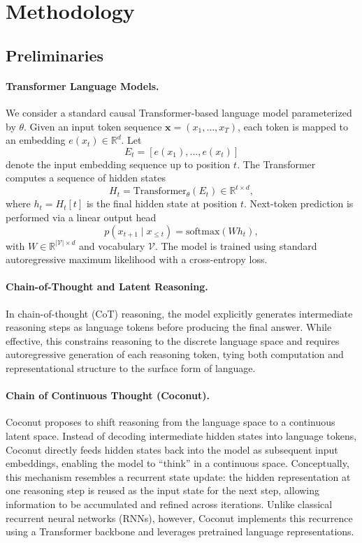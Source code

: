 \section{Methodology}
\subsection{Preliminaries}
\label{sec:preliminaries}

\paragraph{Transformer Language Models.}
We consider a standard causal Transformer-based language model parameterized by $\theta$. Given an input token sequence
$\mathbf{x} = (x_1, \dots, x_T)$, each token is mapped to an embedding $e(x_t) \in \mathbb{R}^d$. Let
\[
E_t = [e(x_1), \dots, e(x_t)]
\]
denote the input embedding sequence up to position $t$. The Transformer computes a sequence of hidden states
\[
H_t = \mathrm{Transformer}_\theta(E_t) \in \mathbb{R}^{t \times d},
\]
where $h_t = H_t[t]$ is the final hidden state at position $t$. Next-token prediction is performed via a linear output head
\[
p(x_{t+1} \mid x_{\le t}) = \mathrm{softmax}(W h_t),
\]
with $W \in \mathbb{R}^{|\mathcal{V}| \times d}$ and vocabulary $\mathcal{V}$. The model is trained using standard
autoregressive maximum likelihood with a cross-entropy loss.

\paragraph{Chain-of-Thought and Latent Reasoning.}
In chain-of-thought (CoT) reasoning, the model explicitly generates intermediate reasoning steps as language tokens before producing the final answer. While effective, this constrains reasoning to the discrete language space and requires autoregressive generation of each reasoning token, tying both computation and representational structure to the surface form of language.

\paragraph{Chain of Continuous Thought (Coconut).}
Coconut proposes to shift reasoning from the language space to a continuous latent space. Instead of decoding intermediate hidden states into language tokens, Coconut directly feeds hidden states back into the model as subsequent input embeddings, enabling the model to ``think'' in a continuous space. Conceptually, this mechanism resembles a recurrent state update: the hidden representation at one reasoning step is reused as the input state for the next step, allowing information to be accumulated and refined across iterations. Unlike classical recurrent neural networks (RNNs), however, Coconut implements this recurrence using a Transformer backbone and leverages pretrained language representations.

